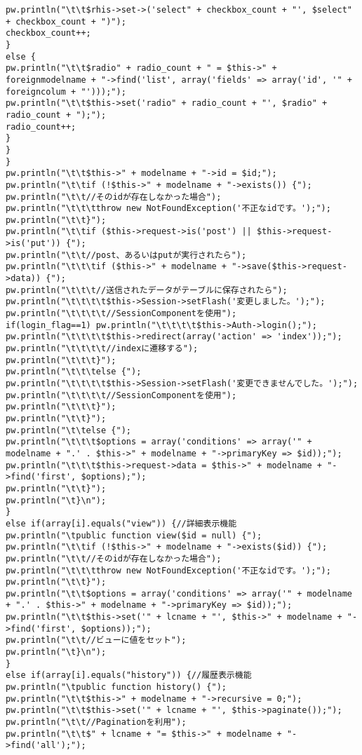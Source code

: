\documentclass{funthesis}
\begin{document}
\begin{lstlisting}[caption=WriteController .java,label=1]
pw.println("\t\t$rhis->set->('select" + checkbox_count + "', $select" + checkbox_count + ")");
checkbox_count++;
}
else {
pw.println("\t\t$radio" + radio_count + " = $this->" + foreignmodelname + "->find('list', array('fields' => array('id', '" + foreigncolum + "')));");
pw.println("\t\t$this->set('radio" + radio_count + "', $radio" + radio_count + ");");			
radio_count++;
}
}
}
pw.println("\t\t$this->" + modelname + "->id = $id;");
pw.println("\t\tif (!$this->" + modelname + "->exists()) {");
pw.println("\t\t//そのidが存在しなかった場合");
pw.println("\t\t\tthrow new NotFoundException('不正なidです。');");
pw.println("\t\t}");
pw.println("\t\tif ($this->request->is('post') || $this->request->is('put')) {");
pw.println("\t\t//post、あるいはputが実行されたら");
pw.println("\t\t\tif ($this->" + modelname + "->save($this->request->data)) {");
pw.println("\t\t\t//送信されたデータがテーブルに保存されたら");
pw.println("\t\t\t\t$this->Session->setFlash('変更しました。');");
pw.println("\t\t\t\t//SessionComponentを使用");
if(login_flag==1) pw.println("\t\t\t\t$this->Auth->login();");
pw.println("\t\t\t\t$this->redirect(array('action' => 'index'));");
pw.println("\t\t\t\t//indexに遷移する");
pw.println("\t\t\t}");
pw.println("\t\t\telse {");
pw.println("\t\t\t\t$this->Session->setFlash('変更できませんでした。');");
pw.println("\t\t\t\t//SessionComponentを使用");
pw.println("\t\t\t}");
pw.println("\t\t}");
pw.println("\t\telse {");
pw.println("\t\t\t$options = array('conditions' => array('" + modelname + ".' . $this->" + modelname + "->primaryKey => $id));");
pw.println("\t\t\t$this->request->data = $this->" + modelname + "->find('first', $options);");
pw.println("\t\t}");
pw.println("\t}\n");
}
else if(array[i].equals("view")) {//詳細表示機能
pw.println("\tpublic function view($id = null) {");
pw.println("\t\tif (!$this->" + modelname + "->exists($id)) {");
pw.println("\t\t//そのidが存在しなかった場合");
pw.println("\t\t\tthrow new NotFoundException('不正なidです。');");
pw.println("\t\t}");
pw.println("\t\t$options = array('conditions' => array('" + modelname + ".' . $this->" + modelname + "->primaryKey => $id));");
pw.println("\t\t$this->set('" + lcname + "', $this->" + modelname + "->find('first', $options));");
pw.println("\t\t//ビューに値をセット");
pw.println("\t}\n");
}
else if(array[i].equals("history")) {//履歴表示機能
pw.println("\tpublic function history() {");
pw.println("\t\t$this->" + modelname + "->recursive = 0;");
pw.println("\t\t$this->set('" + lcname + "', $this->paginate());");
pw.println("\t\t//Paginationを利用");
pw.println("\t\t$" + lcname + "= $this->" + modelname + "->find('all');");

\end{lstlisting}
\end{document}
